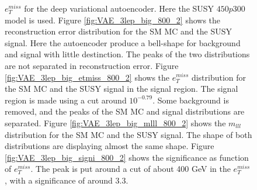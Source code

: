 \begin{figure}[H]
{    $e_T^{miss}$ for the deep variational autoencoder. Here the SUSY $450p300$ model is used. 
    Figure \ref{fig:VAE_3lep_big_800_2} shows the reconstruction error 
    distribution for the SM MC and the SUSY signal. Here the autoencoder produce a bell-shape for background and 
    signal with little destinction. The peaks of the two distributions are not separated in reconstruction error. Figure \ref{fig:VAE_3lep_big_etmiss_800_2} 
    shows the $e_T^{miss}$ distribution for the SM MC and the SUSY signal in the signal region. 
    The signal region is made using a cut around $10^{-0.79}$. Some background is removed, and the peaks of the SM MC and signal 
    distributions are separated. Figure \ref{fig:VAE_3lep_big_mlll_800_2} shows the $m_{lll}$ distribution for the SM MC and the SUSY signal. 
    The shape of both distributions are displaying almost the same shape. Figure \ref{fig:VAE_3lep_big_signi_800_2} shows the significance as 
    function of $e_T^{miss}$. The peak is put around a cut of about 400 GeV in the $e_T^{miss}$, with a significance of around $3.3$.}
    \label{fig:VAE_3lep_big_rec_sig_signi_800_2}
\end{figure}

